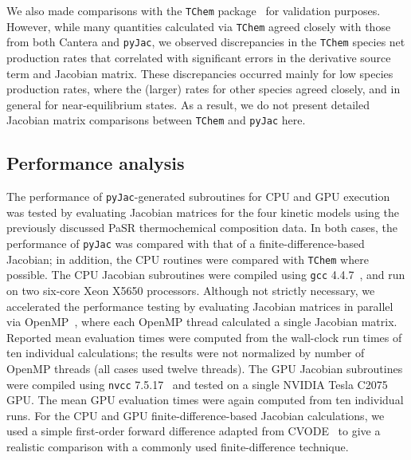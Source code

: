 \documentclass[preprint,12pt]{elsarticle}
\begin{document}
{We also made comparisons with the \texttt{TChem} package~\cite{Safta:2011vn} for validation purposes.
However, while many quantities calculated via \texttt{TChem} agreed closely with those from both Cantera and \texttt{pyJac}, we observed discrepancies in the \texttt{TChem} species net production rates that correlated with significant errors in the derivative source term and Jacobian matrix.
These discrepancies occurred mainly for low species production rates, where the (larger) rates for other species agreed closely, and in general for near-equilibrium states.
As a result, we do not present detailed Jacobian matrix comparisons between \texttt{TChem} and \texttt{pyJac} here.

\subsection{Performance analysis}
\label{s:performance}

The performance of \texttt{pyJac}-generated subroutines for CPU and GPU execution was tested by evaluating Jacobian matrices for the four kinetic models using the previously discussed PaSR thermochemical composition data.
In both cases, the performance of \texttt{pyJac} was compared with that of a finite-difference-based Jacobian; in addition, the CPU routines were compared with \texttt{TChem} where possible.
The CPU Jacobian subroutines were compiled using \texttt{gcc} 4.4.7~\cite{gcc-4.4.7}, and run on two six-core Xeon X5650 processors.
Although not strictly necessary, we accelerated the performance testing by evaluating Jacobian matrices in parallel via OpenMP~\cite{Dagum:1998}, where each OpenMP thread calculated a single Jacobian matrix.
Reported mean evaluation times were computed from the wall-clock run times of ten individual calculations; the results were not normalized by number of OpenMP threads (all cases used twelve threads).
The GPU Jacobian subroutines were compiled using \texttt{nvcc} 7.5.17~\cite{cuda-7.5} and tested on a single NVIDIA Tesla C2075 GPU.
The mean GPU evaluation times were again computed from ten individual runs.
For the CPU and GPU finite-difference-based Jacobian calculations, we used a simple first-order forward difference adapted from CVODE~\cite{Hindmarsh:2005hg} to give a realistic comparison with a commonly used finite-difference technique.

}
\end{document}
